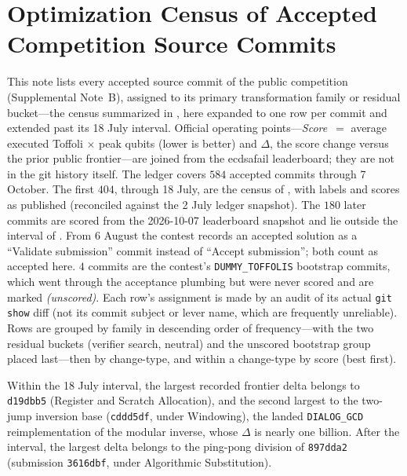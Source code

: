 \section{Optimization Census of Accepted Competition Source Commits}
\label{sec:supp-census}

This note lists every accepted source commit of the public competition
(Supplemental Note~B), assigned to its primary transformation family or
residual bucket---the census summarized in , here
expanded to one row per commit and extended past its 18 July interval.
Official operating points---\emph{Score}~$=$
average executed Toffoli $\times$ peak qubits (lower is better) and $\Delta$, the
score change versus the prior public frontier---are joined from the ecdsafail
leaderboard; they are not in the git history itself. The ledger covers $584$
accepted commits through 7 October. The first $404$, through 18 July,
are the census of , with labels and scores as
published (reconciled against the 2 July ledger snapshot). The $180$ later commits
are scored from the 2026-10-07 leaderboard snapshot
and lie outside the interval of . From 6 August the
contest records an accepted solution as a ``Validate submission'' commit instead of
``Accept submission''; both count as accepted here. $4$ commits are the
contest's \texttt{DUMMY\_TOFFOLIS} bootstrap commits, which went through the
acceptance plumbing but were never scored and are marked \emph{(unscored)}. Each
row's assignment is made by an audit of its actual \texttt{git show} diff (not its
commit subject or lever name, which are frequently unreliable). Rows are grouped by
family in descending order of frequency---with the two residual buckets (verifier
search, neutral) and the unscored bootstrap group placed last---then by change-type,
and within a change-type by score (best first).

Within the 18 July interval, the largest recorded frontier delta belongs to
\texttt{d19dbb5} (Register and Scratch Allocation), and the second largest to the
two-jump inversion base (\texttt{cddd5df}, under Windowing), the landed
\texttt{DIALOG\_GCD} reimplementation of the modular inverse, whose $\Delta$ is
nearly one billion. After the interval, the largest delta belongs to the ping-pong
division of \texttt{897dda2} (submission \texttt{3616dbf}, under Algorithmic
Substitution).

